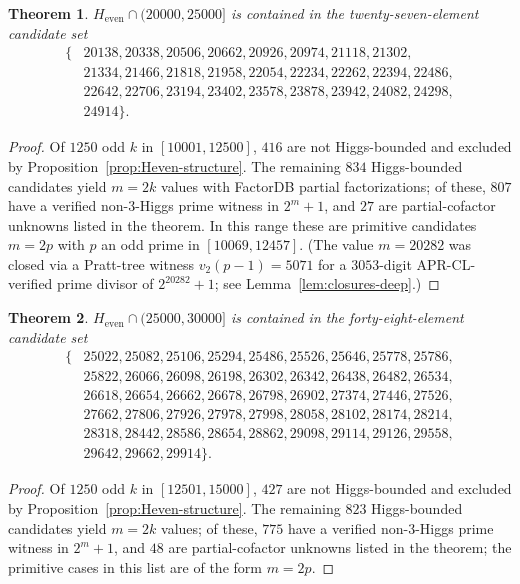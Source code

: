 \documentclass[11pt]{amsart}
\theoremstyle{plain}
\newtheorem{theorem}{Theorem}
\theoremstyle{definition}
\begin{document}
\begin{theorem}\label{thm:Heven-25000}
$H_{\mathrm{even}} \cap (20000, 25000]$ is contained in the
twenty-seven-element candidate set
\[
\begin{aligned}
\{ & 20138, 20338, 20506, 20662, 20926, 20974, 21118, 21302,\\
   & 21334, 21466, 21818, 21958, 22054, 22234, 22262, 22394, 22486,\\
   & 22642, 22706, 23194, 23402, 23578, 23878, 23942, 24082, 24298,\\
   & 24914 \}.
\end{aligned}
\]
\end{theorem}

\begin{proof}
Of $1250$ odd $k$ in $[10001, 12500]$, $416$ are not Higgs-bounded
and excluded by Proposition~\ref{prop:Heven-structure}. The remaining
$834$ Higgs-bounded candidates yield $m = 2k$ values with FactorDB
partial factorizations; of these, $807$ have a verified non-3-Higgs
prime witness in $2^m + 1$, and $27$ are partial-cofactor unknowns
listed in the theorem.  In this range these are primitive candidates
$m=2p$ with $p$ an odd prime in $[10069, 12457]$.
(The value $m = 20282$ was closed via a Pratt-tree witness $v_2(p-1) = 5071$
for a $3053$-digit APR-CL-verified prime divisor of $2^{20282}+1$; see
Lemma~\ref{lem:closures-deep}.)
\end{proof}

\begin{theorem}\label{thm:Heven-30000}
$H_{\mathrm{even}} \cap (25000, 30000]$ is contained in the
forty-eight-element candidate set
\[
\begin{aligned}
\{ & 25022, 25082, 25106, 25294, 25486, 25526, 25646, 25778, 25786,\\
   & 25822, 26066, 26098, 26198, 26302, 26342, 26438, 26482, 26534,\\
   & 26618, 26654, 26662, 26678, 26798, 26902, 27374, 27446, 27526,\\
   & 27662, 27806, 27926, 27978, 27998, 28058, 28102, 28174, 28214,\\
   & 28318, 28442, 28586, 28654, 28862, 29098, 29114, 29126, 29558,\\
   & 29642, 29662, 29914 \}.
\end{aligned}
\]
\end{theorem}

\begin{proof}
Of $1250$ odd $k$ in $[12501, 15000]$, $427$ are not Higgs-bounded
and excluded by Proposition~\ref{prop:Heven-structure}. The remaining
$823$ Higgs-bounded candidates yield $m = 2k$ values; of these,
$775$ have a verified non-3-Higgs prime witness in $2^m + 1$,
and $48$ are partial-cofactor unknowns listed in the theorem; the primitive cases in this list are of the form $m=2p$.
\end{proof}
\end{document}
